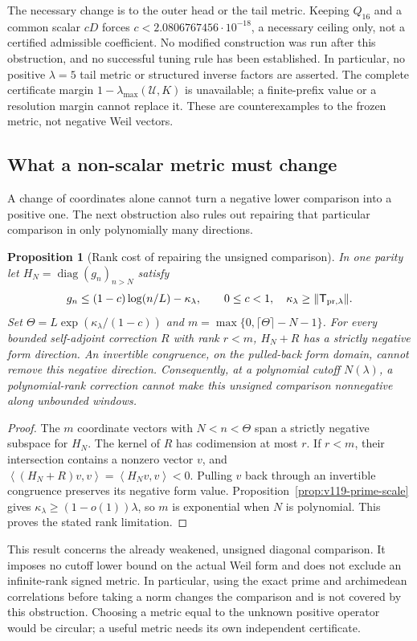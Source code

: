 \documentclass[11pt]{article}
\newtheorem{proposition}[theorem]{Proposition}
\theoremstyle{remark}
\newcommand{\ip}[2]{\left\langle #1,#2\right\rangle}
\begin{document}
The necessary change is to the outer head or the tail metric. Keeping
$Q_{16}$ and a common scalar $cD$ forces
$c<2.0806767456\cdot10^{-18}$, a necessary ceiling only, not a certified
admissible coefficient. No modified construction was run after this
obstruction, and no successful tuning rule has been established.
In particular, no positive $\lambda=5$ tail metric or structured
inverse factors are asserted. The complete certificate margin
$1-\lambda_{\max}(\mathcal U,K)$ is unavailable; a finite-prefix value
or a resolution margin cannot replace it. These are counterexamples
to the frozen metric, not negative Weil vectors.

\subsection*{What a non-scalar metric must change}
A change of coordinates alone cannot turn a negative lower comparison
into a positive one. The next obstruction also rules out repairing
that particular comparison in only polynomially many directions.

\begin{proposition}[Rank cost of repairing the unsigned comparison]
\label{prop:v127-rank-barrier}
In one parity let $H_N=\operatorname{diag}(g_n)_{n>N}$ satisfy
\[
 g_n\le(1-c)\log(n/L)-\kappa_\lambda,\qquad 0\le c<1,
 \quad \kappa_\lambda\ge\|\mathsf T_{{\rm pr},\lambda}\|.
\]
Set $\Theta=L\exp(\kappa_\lambda/(1-c))$ and
$m=\max\{0,\lceil\Theta\rceil-N-1\}$. For every bounded self-adjoint
correction $R$ with rank $r<m$, $H_N+R$ has a strictly negative
form direction. An invertible congruence, on the pulled-back form
domain, cannot remove this negative direction. Consequently, at a
polynomial cutoff $N(\lambda)$, a polynomial-rank correction cannot
make this unsigned comparison nonnegative along unbounded windows.
\end{proposition}
\begin{proof}
The $m$ coordinate vectors with $N<n<\Theta$ span a strictly negative
subspace for $H_N$. The kernel of $R$ has codimension at most $r$.
If $r<m$, their intersection contains a nonzero vector $v$, and
$\ip{(H_N+R)v}{v}=\ip{H_Nv}{v}<0$. Pulling $v$ back through an
invertible congruence preserves its negative form value.
Proposition~\ref{prop:v119-prime-scale} gives
$\kappa_\lambda\ge(1-o(1))\lambda$, so $m$ is exponential when
$N$ is polynomial. This proves the stated rank limitation.
\end{proof}

This result concerns the already weakened, unsigned diagonal
comparison. It imposes no cutoff lower bound on the actual Weil form
and does not exclude an infinite-rank signed metric. In particular,
using the exact prime and archimedean correlations before taking a
norm changes the comparison and is not covered by this obstruction.
Choosing a metric equal to the unknown positive operator would be
circular; a useful metric needs its own independent certificate.
\end{document}
